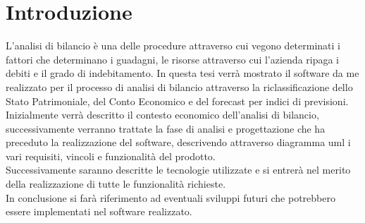 \chapter*{Introduzione}

L'analisi di bilancio è una delle procedure attraverso cui vegono determinati i fattori che determinano i guadagni, le risorse attraverso cui l'azienda ripaga i debiti e il grado di indebitamento.
In questa tesi verrà mostrato il software da me realizzato per il processo di analisi di bilancio attraverso la riclassificazione dello Stato Patrimoniale, del Conto Economico e del forecast per indici di previsioni.\\
Inizialmente verrà descritto il contesto economico dell'analisi di bilancio, successivamente verranno trattate la fase di analisi e progettazione che ha preceduto la realizzazione del software, descrivendo attraverso diagramma \Gls{uml} \cite{uml} i vari requisiti, vincoli e funzionalità del prodotto. \\
Successivamente saranno descritte le tecnologie utilizzate e si entrerà nel merito della realizzazione di tutte le funzionalità richieste. \\
In conclusione si farà riferimento ad eventuali sviluppi futuri che potrebbero essere implementati nel software realizzato.